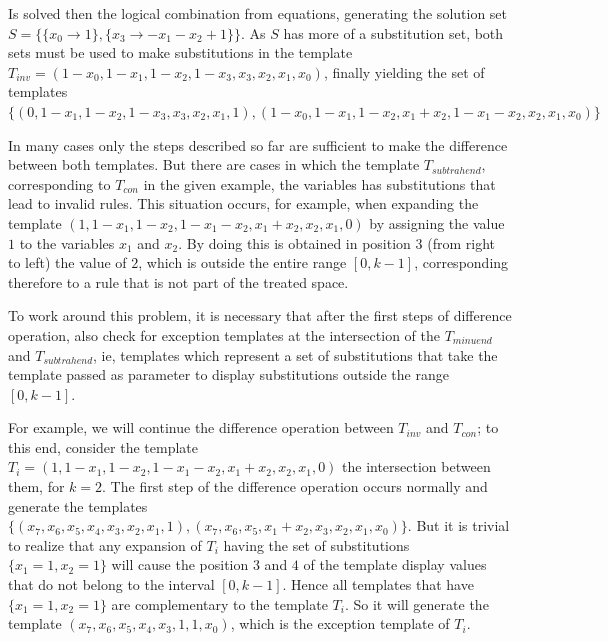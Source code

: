 \documentclass{llncs}
\begin{document}
Is solved then the logical combination from equations, generating the solution set $S = \{\{x_0\to 1\},\{x_3\to -x_1-x_2+1\}\}$. As $S$ has more of a substitution set, both sets must be used to make substitutions in the template $T_{inv} = (1 - x_0, 1 - x_1, 1 - x_2, 1 - x_3, x_3, x_2, x_1, x_0)$, finally yielding the set of templates $\{(0, 1 - x_1, 1 - x_2, 1 - x_3, x_3, x_2, x_1, 1),(1 - x_0, 1 - x_1, 1 - x_2, x_1 + x_2, 1 - x_1 - x_2, x_2, x_1, x_0)\}$

In many cases only the steps described so far are sufficient to make the difference between both templates. But there are cases in which the template $T_{subtrahend}$, corresponding to $T_{con}$ in the given example, the variables has substitutions that lead to invalid rules. This situation occurs, for example, when expanding the template $(1, 1 - x_1, 1 - x_2, 1 - x_1 - x_2, x_1 + x_2, x_2, x_1, 0)$ by assigning the value $1$ to the variables $x_1$ and $x_2$. By doing this is obtained in position $3$ (from right to left) the value of $2$, which is outside the entire range $[0, k-1]$, corresponding therefore to a rule that is not part of the treated space.

To work around this problem, it is necessary that after the first steps of difference operation, also check for exception templates at the intersection of the $T_{minuend}$ and $T_{subtrahend}$, ie, templates which represent a set of substitutions that take the template passed as parameter to display  substitutions outside the range $[0,k-1]$. %

For example, we will continue the difference operation between $T_{inv}$ and $T_{con}$; to this end, consider the template $T_i = (1, 1 - x_1, 1 - x_2, 1 - x_1 - x_2, x_1 + x_2, x_2, x_1, 0)$ the intersection between them, for $k=2$.
The first step of the difference operation occurs normally and generate the templates $\{(x_7, x_6, x_5, x_4, x_3, x_2, x_1, 1),(x_7, x_6, x_5, x_1 + x_2, x_3, x_2, x_1, x_0)\}$.
But it is trivial to realize that any expansion of $T_i$ having the set of substitutions $\{x_1 = 1, x_2 = 1\}$ will cause the position $3$ and $4$ of the template display values that do not belong to the interval $[0,k-1]$.
Hence all templates that have $\{x_1 = 1, x_2 = 1\}$ are complementary to the template $T_i$. So it will generate the template $(x_7, x_6, x_5, x_4, x_3, 1, 1, x_0)$, which is the exception template of $T_i$.
\end{document}

